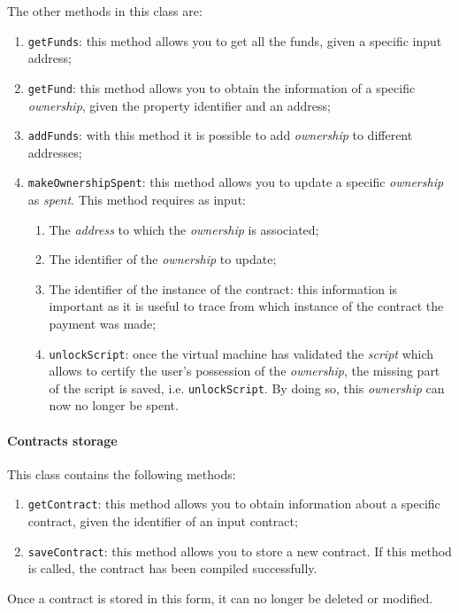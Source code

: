 The other methods in this class are:
\begin{enumerate}
  \item \verb|getFunds|: this method allows you to get all the funds, given a specific input address;
  \item \verb|getFund|: this method allows you to obtain the information of a specific \textit{ownership}, 
  given the property identifier and an address;
  \item \verb|addFunds|: with this method it is possible to add \textit{ownership} to different addresses;
  \item \verb|makeOwnershipSpent|: this method allows you to update a specific \textit{ownership} as 
  \textit{spent}. This method requires as input:
  \begin{enumerate}
    \item The \textit{address} to which the \textit{ownership} is associated;
    \item The identifier of the \textit{ownership} to update;
    \item The identifier of the instance of the contract: this information is important as it is useful to 
    trace from which instance of the contract the payment was made;
    \item \verb|unlockScript|: once the virtual machine has validated the \textit{script} which allows to 
    certify the user's possession of the \textit{ownership}, the missing part of the script is saved, 
    i.e. \verb|unlockScript|. By doing so, this \textit{ownership} can now no longer be spent.
  \end{enumerate}
\end{enumerate}

\paragraph{Contracts storage}

This class contains the following methods:
\begin{enumerate}
  \item \verb|getContract|: this method allows you to obtain information about a specific contract, given 
  the identifier of an input contract;
  \item \verb|saveContract|: this method allows you to store a new contract. If this method is called, 
  the contract has been compiled successfully.
\end{enumerate}

Once a contract is stored in this form, it can no longer be deleted or modified.

